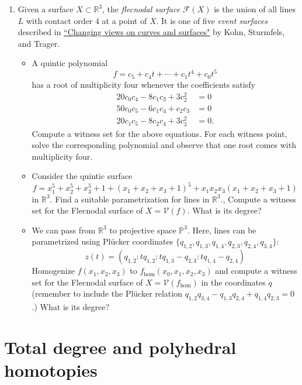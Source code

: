 \documentclass[11pt,reqno]{amsart}
\theoremstyle{definition}
\theoremstyle{remark}
\numberwithin{equation}{section}
\begin{document}
\begin{enumerate}
\item Given a surface $X \subset \mathbb{R}^3$, the {\textit{flecnodal surface}} $\mathcal{F}(X)$ is the union of all lines $L$ with contact order $4$ at a point of $X$. It is one of five {\textit{event surfaces}} described in \href{https://arxiv.org/pdf/1707.01877.pdf}{ ``Changing views on curves and surfaces"} by Kohn, Sturmfels, and Trager.
\begin{itemize}
\item A quintic polynomial $$f=c_5+c_4t+\cdots+c_1t^4+c_0t^5$$ has a root of multiplicity four whenever the coefficients satisfy
\begin{align*}
20c_0c_4-8c_1c_3+3c_2^2&=0 \\
50c_0c_5-6c_1c_4+c_2c_3&=0 \\
20c_1c_5-8c_2c_4+3c_3^2&=0.
\end{align*}
Compute a witness set for the above equations. For each witness point, solve the corresponding polynomial and observe that one root comes with multiplicity four.
\item Consider the quintic surface $$f = x_1^5+x_2^5+x_3^5+1+(x_1+x_2+x_3+1)^5+x_1x_2x_3(x_1+x_2+x_3+1)$$
in $\mathbb{R}^3$. Find a suitable parametrization for lines in $\mathbb R^3$., Compute a witness set for the Flecnodal surface of $X=\mathcal{V}(f)$. What is its degree?
\item We can pass from $\mathbb R^3$ to projective space $\mathbb P^3$. Here, lines can be parametrized using Pl\"ucker coordinates $\{q_{1,2},q_{1,3},q_{1,4},q_{2,3},q_{2,4},q_{3,4}\}$:
$$z(t) = (q_{1,2}:tq_{1,2}:tq_{1,3}-q_{2,3}:tq_{1,4}-q_{2,4})$$
Homogenize $f(x_1,x_2,x_3)$ to $f_\mathrm{hom}(x_0,x_1,x_2,x_3)$ and compute a witness set for the Flecnodal surface of $X=\mathcal{V}(f_\mathrm{hom})$ in the coordinates $q$ (remember to include the Pl\"ucker relation $q_{1,2}q_{3,4}-q_{1,3}q_{2,4}+q_{1,4}q_{2,3}=0$.) What is its degree?
\end{itemize}




\end{enumerate}


\section{Total degree and polyhedral homotopies}
\end{document}
